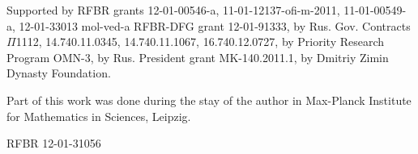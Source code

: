 Supported by RFBR grants 12-01-00546-a, 11-01-12137-ofi-m-2011, 11-01-00549-a, 12-01-33013 mol-ved-a 
RFBR-DFG grant 12-01-91333, by Rus. Gov. Contracts $\Pi$1112, 14.740.11.0345, 14.740.11.1067, 16.740.12.0727,
by Priority Research Program OMN-3,                                                                                                                                                                                                                         %
by Rus. President grant MK-140.2011.1, by Dmitriy Zimin Dynasty
Foundation. %

Part of this work was done during the stay of the author
in Max-Planck Institute for Mathematics in Sciences, Leipzig. %

RFBR 12-01-31056 %



